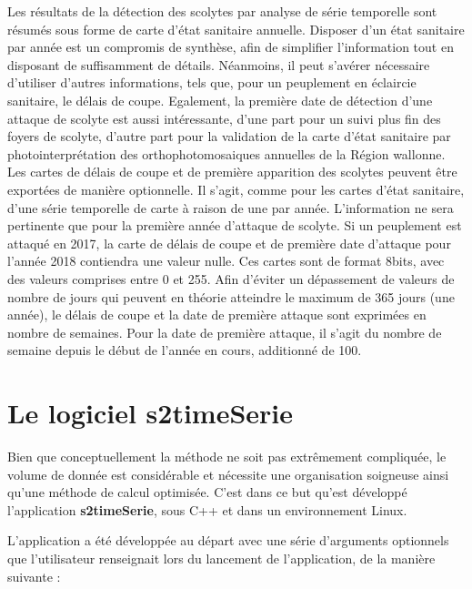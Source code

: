 \documentclass[a4paper, 12pt]{article} %
\begin{document}
Les résultats de la détection des scolytes par analyse de série temporelle sont résumés sous forme de carte d'état sanitaire annuelle. Disposer d'un état sanitaire par année est un compromis de synthèse, afin de simplifier l'information tout en disposant de suffisamment de détails. Néanmoins, il peut s'avérer nécessaire d'utiliser d'autres informations, tels que, pour un peuplement en éclaircie sanitaire, le délais de coupe. Egalement, la première date de détection d'une attaque de scolyte est aussi intéressante, d'une part pour un suivi plus fin des foyers de scolyte, d'autre part pour la validation de la carte d'état sanitaire par photointerprétation des orthophotomosaiques annuelles de la Région wallonne.
Les cartes de délais de coupe et de première apparition des scolytes peuvent être exportées de manière optionnelle. Il s'agit, comme pour les cartes d'état sanitaire, d'une série temporelle de carte à raison de une par année.
L'information ne sera pertinente que pour la première année d'attaque de scolyte. 
Si un peuplement est attaqué en 2017, la carte de délais de coupe et de première date d'attaque pour l'année  2018 contiendra une valeur nulle.
Ces cartes sont de format 8bits, avec des valeurs comprises entre 0 et 255.
Afin d'éviter un dépassement de valeurs de nombre de jours qui peuvent en théorie atteindre le maximum de 365 jours (une année), le délais de coupe et la date de première attaque sont exprimées en nombre de semaines. Pour la date de première attaque, il s'agit du nombre de semaine depuis le début de l'année en cours, additionné de 100.


\iffalse
\section{Le logiciel s2{\textunderscore}timeSerie}

Bien que conceptuellement la méthode ne soit pas extrêmement compliquée, le volume de donnée est considérable et nécessite une organisation soigneuse ainsi qu'une méthode de calcul optimisée. C'est dans ce but qu'est développé l'application \textbf{s2{\textunderscore}timeSerie}, sous C++ et dans un environnement Linux.

L'application a été développée au départ avec une série d'arguments optionnels que l'utilisateur renseignait lors du lancement de l'application, de la manière suivante :
\end{document}
